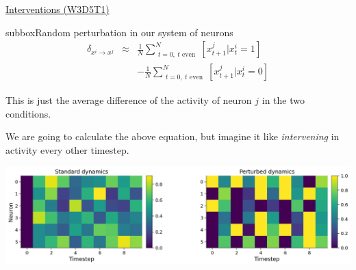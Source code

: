 \begin{textbox}{\href{https://compneuro.neuromatch.io/tutorials/W3D5_NetworkCausality/student/W3D5_Tutorial1.html}{Interventions (W3D5T1)}   }
\begin{subbox}{subbox}{Random perturbation in our system of neurons}
\begin{eqnarray*}
\delta_{x^i\to x^j} &\approx& \frac1N \sum_{\substack{t=0, \ t \text{ even}}}^N[x_{t+1}^j | x^i_t=1] \\ & & - \frac1N \sum_{\substack{t=0, \ t \text{ even}}}^N[x_{t+1}^j | x^i_t=0]
\end{eqnarray*}

This is just the average difference of the activity of neuron $j$ in the two conditions.

We are going to calculate the above equation, but imagine it like \textit{intervening} in activity every other timestep.

\begin{center}
    
\includegraphics[scale=0.2]{Figures/NC/NC_Figure3.png}
\end{center}
\end{subbox}
\end{textbox}
